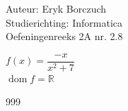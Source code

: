 \documentclass[a4paper]{article}
\begin{document}
  
\noindent \large Auteur: Eryk Borczuch \\
\noindent \large Studierichting: Informatica\\
\noindent \large Oefeningenreeks 2A nr. 2.8\\

\medskip

\normalsize

$f(x) = \dfrac{-x}{x^2+7}$\\

$\operatorname{dom} f = \mathbb{R}$

\begin{thebibliography}{999}
\end{thebibliography}
\end{document}
